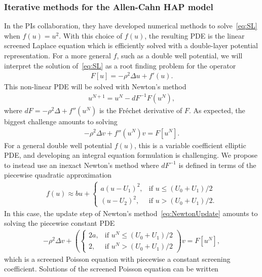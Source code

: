 \subsubsection{Iterative methods for the Allen-Cahn HAP model}
\label{subsec:AC}
In the PIs collaboration, they have developed numerical methods to
solve~\eqref{eq:SL} when $f(u) = u^2$. With this choice of $f(u)$, the
resulting PDE is the linear screened Laplace equation which is
efficiently solved with a double-layer potential representation. For a
more general $f$, such as a double well potential, we will interpret the
solution of~\eqref{eq:SL} as a root finding problem for the operator
\begin{align*}
  F[u] = -\rho^2 \Delta u + f'(u).
\end{align*}
This non-linear PDE will be solved with Newton's method
\begin{align*}
  u^{N+1} = u^{N} - dF^{-1} F(u^N),
\end{align*}
where $dF = -\rho^2 \Delta + f''(u^N)$ is the Fr\'{e}chet derivative of
$F$. As expected, the biggest challenge amounts to solving
\begin{align}
  \label{eq:NewtonUpdate}
  - \rho^2 \Delta v + f''(u^{N}) v = F[u^N].
\end{align}
For a general double well potential $f(u)$, this is a variable
coefficient elliptic PDE, and developing an integral equation
formulation is challenging. We propose to instead use an inexact
Newton's method where $dF^{-1}$ is defined in terms of the piecewise
quadratic approximation
\begin{align*}
  f(u) \approx bu + \begin{cases}
    a(u - U_1)^2, &\mbox{if } u \leq (U_0 + U_1)/2 \\
    (u - U_2)^2, &\mbox{if } u > (U_0 + U_1)/2.
  \end{cases}
\end{align*}
In this case, the update step of Newton's method~\eqref{eq:NewtonUpdate}
amounts to solving the piecewise constant PDE
\begin{align}
  \label{eq:screenedPoisson}
  -\rho^2 \Delta v + 
  \left(
  \begin{cases}
    2a, &\mbox{if } u^{N} \leq (U_0 + U_1)/2 \\
    2, &\mbox{if } u^{N} > (U_0 + U_1)/2
  \end{cases}
  \right)
  v = F[u^N],
\end{align}
which is a screened Poisson equation with piecewise a constant screening
coefficient. Solutions of the screened Poisson equation can be written
